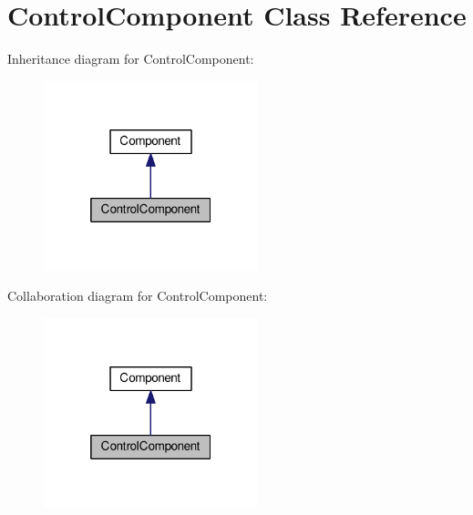 \hypertarget{classControlComponent}{\section{Control\-Component Class Reference}
\label{classControlComponent}
}


Inheritance diagram for Control\-Component\-:
\nopagebreak
\begin{figure}[H]
\begin{center}
\leavevmode
\includegraphics[width=176pt]{classControlComponent__inherit__graph}
\end{center}
\end{figure}


Collaboration diagram for Control\-Component\-:
\nopagebreak
\begin{figure}[H]
\begin{center}
\leavevmode
\includegraphics[width=176pt]{classControlComponent__coll__graph}
\end{center}
\end{figure}
